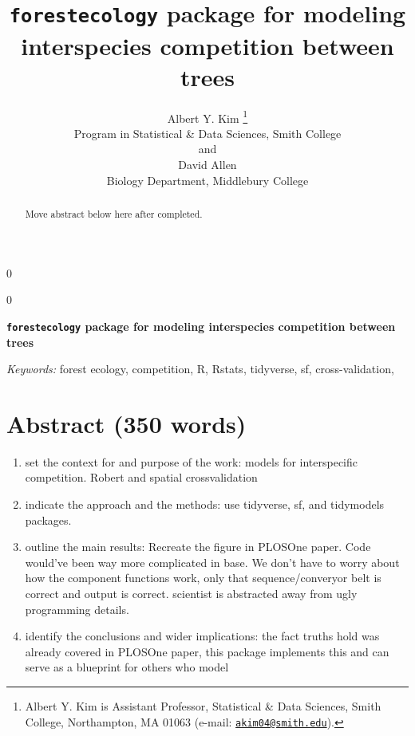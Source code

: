 \documentclass[12pt]{article}
\providecommand{\tightlist}{%
  \setlength{\itemsep}{0pt}\setlength{\parskip}{0pt}}
\newcommand{\blind}{0}
\begin{document}
\def\spacingset#1{\renewcommand{\baselinestretch}%
{#1}\small\normalsize} \spacingset{1}



\blind
{
  \title{\bf \texttt{forestecology} package for modeling interspecies competition
between trees}

  \author{
        Albert Y. Kim \thanks{Albert Y. Kim is Assistant Professor, Statistical \& Data Sciences,
Smith College, Northampton, MA 01063 (e-mail:
\href{mailto:akim04@smith.edu}{\nolinkurl{akim04@smith.edu}}).} \\
    Program in Statistical \& Data Sciences, Smith College\\
     and \\     David Allen \\
    Biology Department, Middlebury College\\
      }
  \maketitle
} \fi

\blind
{
  \bigskip
  \bigskip
  \bigskip
  \begin{center}
    {\LARGE\bf \texttt{forestecology} package for modeling interspecies competition
between trees}
  \end{center}
  \medskip
} \fi

\bigskip
\begin{abstract}
Move abstract below here after completed.
\end{abstract}

\noindent%
{\it Keywords:} forest ecology, competition, R, Rstats, tidyverse, sf, cross-validation,
\vfill

\newpage
\spacingset{1.45} %

\linenumbers

\hypertarget{abstract-350-words}{%
\section{Abstract (350 words)}\label{abstract-350-words}}

\begin{enumerate}
\def\labelenumi{\arabic{enumi}.}
\tightlist
\item
  set the context for and purpose of the work: models for interspecific
  competition. Robert and spatial crossvalidation
\item
  indicate the approach and the methods: use tidyverse, sf, and
  tidymodels packages.
\item
  outline the main results: Recreate the figure in PLOSOne paper. Code
  would've been way more complicated in base. We don't have to worry
  about how the component functions work, only that sequence/converyor
  belt is correct and output is correct. scientist is abstracted away
  from ugly programming details.
\item
  identify the conclusions and wider implications: the fact truths hold
  was already covered in PLOSOne paper, this package implements this and
  can serve as a blueprint for others who model
\end{enumerate}
\end{document}
